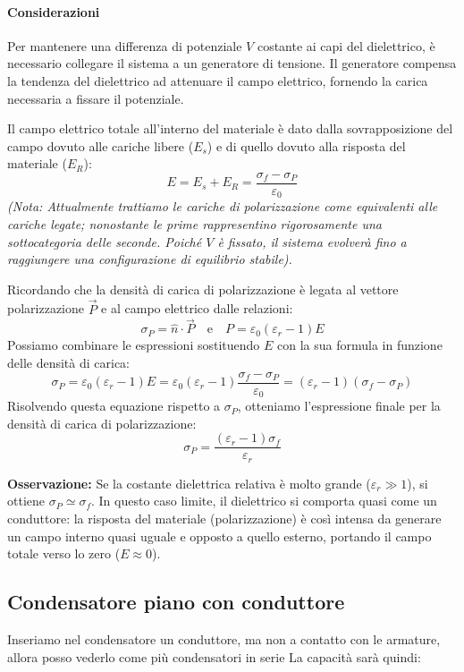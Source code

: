 \documentclass{book}
\begin{document}
\paragraph{Considerazioni}
Per mantenere una differenza di potenziale $V$ costante ai capi del dielettrico, è necessario collegare il sistema a un generatore di tensione. Il generatore compensa la tendenza del dielettrico ad attenuare il campo elettrico, fornendo la carica necessaria a fissare il potenziale.

Il campo elettrico totale all'interno del materiale è dato dalla sovrapposizione del campo dovuto alle cariche libere ($E_s$) e di quello dovuto alla risposta del materiale ($E_R$):
\[
E = E_s + E_R = \frac{\sigma_f - \sigma_P}{\varepsilon_0}
\]
\textit{(Nota: Attualmente trattiamo le cariche di polarizzazione come equivalenti alle cariche legate; nonostante le prime rappresentino rigorosamente una sottocategoria delle seconde. Poiché $V$ è fissato, il sistema evolverà fino a raggiungere una configurazione di equilibrio stabile).}

Ricordando che la densità di carica di polarizzazione è legata al vettore polarizzazione $\vec{P}$ e al campo elettrico dalle relazioni:
\[
\sigma_P = \hat{n} \cdot \vec{P} \quad \text{e} \quad P = \varepsilon_0(\varepsilon_r-1)E
\]
Possiamo combinare le espressioni sostituendo $E$ con la sua formula in funzione delle densità di carica:
\[
\sigma_P = \varepsilon_0 (\varepsilon_r-1)E = \varepsilon_0(\varepsilon_r-1)\frac{\sigma_f -\sigma_P}{\varepsilon_0} = (\varepsilon_r-1)(\sigma_f - \sigma_P)
\]
Risolvendo questa equazione rispetto a $\sigma_P$, otteniamo l'espressione finale per la densità di carica di polarizzazione:
\[
\sigma_P = \frac{(\varepsilon_r-1)\sigma_f}{\varepsilon_r}
\]

\textbf{Osservazione:} Se la costante dielettrica relativa è molto grande ($\varepsilon_r \gg 1$), si ottiene $\sigma_P \simeq \sigma_f$.
In questo caso limite, il dielettrico si comporta quasi come un conduttore: la risposta del materiale (polarizzazione) è così intensa da generare un campo interno quasi uguale e opposto a quello esterno, portando il campo totale verso lo zero ($E \approx 0$).


\subsection{Condensatore piano con conduttore}
Inseriamo nel condensatore un conduttore, ma non a contatto con le armature, allora posso vederlo come più condensatori in serie
La capacità sarà quindi:
\end{document}
